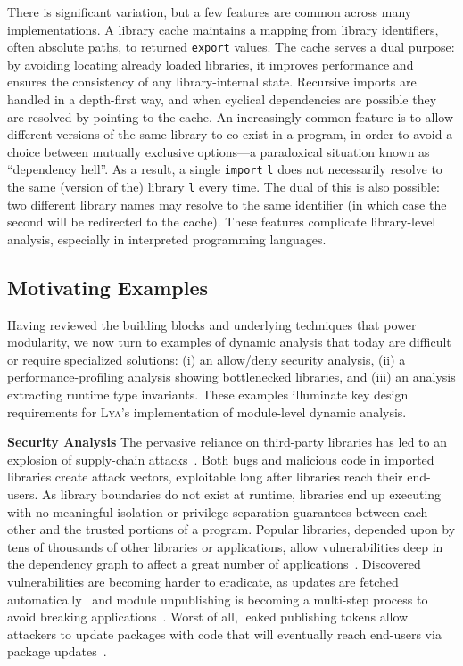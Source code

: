 \documentclass[letterpaper,twocolumn,10pt]{article}
\newcommand{\heading}[1]{\vspace{2pt}\noindent\textbf{#1}\enspace}
\newcommand{\ttt}[1]{\texttt{#1}}
\newcommand{\sys}{{\scshape Lya}\xspace}
\begin{document}
There is significant variation, but a few features are common across many implementations.
A library cache maintains a mapping from library identifiers, often absolute paths, to returned \ttt{export} values.
The cache serves a dual purpose:
  by avoiding locating already loaded libraries, it improves performance and ensures the consistency of any library-internal state.
Recursive imports are handled in a depth-first way, and when cyclical dependencies are possible they are resolved by pointing to the cache.
An increasingly common feature is to allow different versions of the same library to co-exist in a program, in order to avoid a choice between mutually exclusive options---a paradoxical situation known as ``dependency hell''.
As a result, a single \ttt{import} \ttt{l} does not necessarily resolve to the same (version of the) library \ttt{l} every time.
The dual of this is also possible: two different library names may resolve to the same identifier (in which case the second will be redirected to the cache).
These features complicate library-level analysis, especially in interpreted programming languages.



\subsection{Motivating Examples}

Having reviewed the building blocks and underlying techniques that power modularity, we now turn to examples of dynamic analysis that today are difficult or require specialized solutions:
  (i) an allow/deny security analysis,
  (ii) a performance-profiling analysis showing bottlenecked libraries, and
  (iii) an analysis extracting runtime type invariants.
These examples illuminate key design requirements for \sys's implementation of module-level dynamic analysis.

\heading{Security Analysis}
The pervasive reliance on third-party libraries has led to an explosion of supply-chain attacks~\cite{long2015owasp, maass2016theory, snyk, lauinger2017thou}.
Both bugs and malicious code in imported libraries create attack vectors, exploitable long after libraries reach their end-users.
As library boundaries do not exist at runtime, libraries end up executing with no meaningful isolation or privilege separation guarantees between each other and the trusted portions of a program.
Popular libraries, depended upon by tens of thousands of other libraries or applications, allow vulnerabilities deep in the dependency graph to affect a great number of applications~\cite{leftpad, npmstudy:19}.
Discovered vulnerabilities are becoming harder to eradicate, as updates are fetched automatically~\cite{npmFailure} and module unpublishing is becoming a multi-step process to avoid breaking applications~\cite{npmUnpublish}.
Worst of all, leaked publishing tokens allow attackers to update packages with code that will eventually reach end-users via package updates~\cite{eslint1}.
\end{document}
